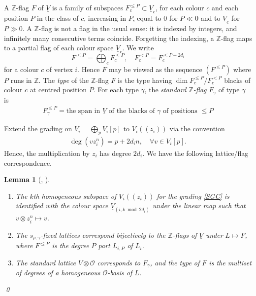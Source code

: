\documentclass[11pt,reqno]{amsart}
\newtheorem{Lemma}[Theorem]{Lemma}
\theoremstyle{definition}
\theoremstyle{remark}
\def\bbZ{\mathbb Z}
\def\dV{\underline V}
\providecommand{\calO}{\mathcal O}
\newcommand{\llp}{(\!(}
\newcommand{\rrp}{)\!)}
\begin{document}
A {$\bbZ$-flag} $F$ of $\dV$ is a family of subspaces $F_c^{\leqslant P}\subset\dV_c$, for each colour $c$ and each
position $P$ in the class of $c$, increasing in $P$, equal to $0$ for $P\ll0$ and to $\dV_c$ for $P\gg0$. 
A  $\bbZ$-flag is not a flag in the usual sense: it is indexed by integers, 
and infinitely many consecutive terms coincide. 
Forgetting the indexing, a $\bbZ$-flag  maps to a partial flag of each colour space $\dV_c$. We write
$$F^{\leqslant P}=\bigoplus_c F_c^{\leqslant P}
,\quad
F_c^{<P}=F_c^{\leqslant P-2d_i}$$ 
for a colour $c$ of vertex $i$. 
Hence $F$ may be viewed as the sequence $(F^{\leqslant P})$ where $P$ runs in $\mathbb Z$.
The \emph{type} of the $\mathbb Z$-flag $F$ is the type
 having $\dim F_c^{\leqslant P}/F_c^{<P}$ blacks of colour $c$ at centred position $P$. 
For each type $\gamma$, the
\emph{standard $\bbZ$-flag} $F_\gamma$ of type $\gamma$ is 
\begin{align}\label{SZF}F_\gamma^{\leqslant P}= \text{the\ span\ in $\dV$\ of\ the\ blacks\ of $\gamma$\ of\ positions\ }\leqslant P\end{align}

Extend the grading on $V_i=\bigoplus_p V_i[p]$ to $V_i\llp z_i\rrp$ via the convention
\begin{align}\label{SGC}\deg(vz_i^n)=p+2d_i n,\quad\forall v\in V_i[p].\end{align}
Hence, the multiplication by $z_i$ has degree $2d_i$.
We have the following lattice/flag correspondence.



\begin{Lemma}[\cite{VV25}, \cite{VVsh}]\label{lem:semilinear-flags}\hfill
\begin{enumerate}[label=$\mathrm{(\alph*)}$,leftmargin=8mm]
\item
The $k$th homogeneous subspace of $V_i\llp z_i\rrp$ for the grading \eqref{SGC} is identified with the
colour space $\dV_{(i,k\bmod 2d_i)}$ under the linear map such that
$v\otimes z_i^n\mapsto v$. 
\item
The $s_{\rho,\gamma}$-fixed lattices correspond
bijectively to the $\bbZ$-flags of $\dV$ under $L\mapsto F$,
where $F^{\leqslant P}$ is the degree $P$ part $L_{i,P}$ of $L_i$.
\item
The standard lattice $V\otimes\calO$ corresponds to $F_\gamma$,
and the type of $F$ is the multiset of degrees of a homogeneous
$\calO$-basis of $L$.
\end{enumerate}
\qed
\end{Lemma}
\end{document}
